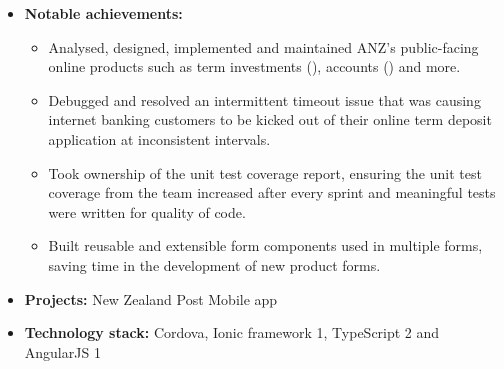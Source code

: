 \documentclass[11.5pt,a4paper,sans]{moderncv}        %
\begin{document}
    \begin{itemize}
        \item \textbf{Notable achievements:}
         \begin{itemize}
        \item Analysed, designed, implemented and maintained ANZ's public-facing online products such as term investments (), accounts () and more.
        \item Debugged and resolved an intermittent timeout issue that was causing internet banking customers to be kicked out of their online term deposit application at inconsistent intervals.
        \item Took ownership of the unit test coverage report, ensuring the unit test coverage from the team increased after every sprint and meaningful tests were written for quality of code.
        \item Built reusable and extensible form components used in multiple forms, saving time in the development of new product forms.    
    \end{itemize}
    \end{itemize}
    \hfill \break
    \begin{itemize}
        \item \textbf{Projects:} New Zealand Post Mobile app
        \item \textbf{Technology stack:} Cordova, Ionic framework 1, TypeScript 2 and AngularJS 1
    \end{itemize}
\end{document}

